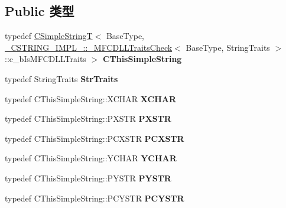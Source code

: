 \subsection*{Public 类型}
\begin{DoxyCompactItemize}
\item 
\mbox{\label{class_a_t_l_1_1_c_string_t_ae97ea41ca7c402ab9dd8ea533e5caf15}} 
typedef \hyperlink{class_a_t_l_1_1_c_simple_string_t}{C\+Simple\+StringT}$<$ Base\+Type, \hyperlink{struct_a_t_l_1_1___c_s_t_r_i_n_g___i_m_p_l___1_1___m_f_c_d_l_l_traits_check}{\+\_\+\+C\+S\+T\+R\+I\+N\+G\+\_\+\+I\+M\+P\+L\+\_\+\+::\+\_\+\+M\+F\+C\+D\+L\+L\+Traits\+Check}$<$ Base\+Type, String\+Traits $>$\+::c\+\_\+b\+Is\+M\+F\+C\+D\+L\+L\+Traits $>$ {\bfseries C\+This\+Simple\+String}
\item 
\mbox{\label{class_a_t_l_1_1_c_string_t_a86487f0172ecf317dc22e73d4f601e4f}} 
typedef String\+Traits {\bfseries Str\+Traits}
\item 
\mbox{\label{class_a_t_l_1_1_c_string_t_aaf1ba5fff3d0e0989816afa3c45c9746}} 
typedef C\+This\+Simple\+String\+::\+X\+C\+H\+AR {\bfseries X\+C\+H\+AR}
\item 
\mbox{\label{class_a_t_l_1_1_c_string_t_abf27af3e6cc48a5c4553f34d71bca334}} 
typedef C\+This\+Simple\+String\+::\+P\+X\+S\+TR {\bfseries P\+X\+S\+TR}
\item 
\mbox{\label{class_a_t_l_1_1_c_string_t_a2e4e0a0982d932cd1d90851032526c49}} 
typedef C\+This\+Simple\+String\+::\+P\+C\+X\+S\+TR {\bfseries P\+C\+X\+S\+TR}
\item 
\mbox{\label{class_a_t_l_1_1_c_string_t_a90ca636de957f247b80c04d2e6d7c607}} 
typedef C\+This\+Simple\+String\+::\+Y\+C\+H\+AR {\bfseries Y\+C\+H\+AR}
\item 
\mbox{\label{class_a_t_l_1_1_c_string_t_ac036dc446ea645226bfda988aee11745}} 
typedef C\+This\+Simple\+String\+::\+P\+Y\+S\+TR {\bfseries P\+Y\+S\+TR}
\item 
\mbox{\label{class_a_t_l_1_1_c_string_t_a188af4adbbc282a7e01efbf32191b5b5}} 
typedef C\+This\+Simple\+String\+::\+P\+C\+Y\+S\+TR {\bfseries P\+C\+Y\+S\+TR}
\end{DoxyCompactItemize}
